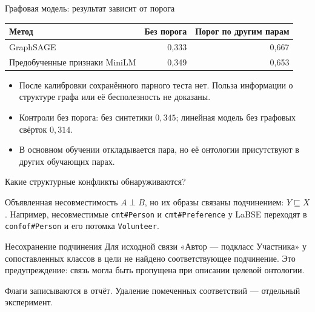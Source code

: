 \documentclass[aspectratio=169,11pt]{beamer}
\begin{document}
\renewcommand{\hseheadertext}{Дополнительные материалы}
\begin{frame}{Графовая модель: результат зависит от порога}
  \begin{tabular}{@{}lrr@{}}
    \toprule
    Метод & Без порога & Порог по другим парам \\
    \midrule
    GraphSAGE & 0{,}333 & 0{,}667 \\
    Предобученные признаки MiniLM & 0{,}349 & 0{,}653 \\
    \bottomrule
  \end{tabular}
  \medskip
  \begin{itemize}
    \item После калибровки сохранённого парного теста нет.
      Польза информации о структуре графа или её бесполезность не доказаны.
    \item Контроли без порога: без синтетики $0{,}345$;
      линейная модель без графовых свёрток $0{,}314$.
    \item В основном обучении откладывается пара, но её онтологии
      присутствуют в других обучающих парах.
  \end{itemize}
\end{frame}

\renewcommand{\hseheadertext}{Дополнительные материалы}
\begin{frame}{Какие структурные конфликты обнаруживаются?}
  \begin{block}{Объявленная несовместимость}
    $A\perp B$, но их образы связаны подчинением: $Y\sqsubseteq X$.
    Например, несовместимые \texttt{cmt\#Person} и \texttt{cmt\#Preference}
    у LaBSE переходят в \texttt{confof\#Person} и его потомка \texttt{Volunteer}.
  \end{block}
  \begin{block}{Несохранение подчинения}
    Для исходной связи «Автор — подкласс Участника» у сопоставленных классов
    в цели не найдено соответствующее подчинение. Это предупреждение:
    связь могла быть пропущена при описании целевой онтологии.
  \end{block}
  Флаги записываются в отчёт. Удаление помеченных соответствий — отдельный эксперимент.
\end{frame}
\end{document}
